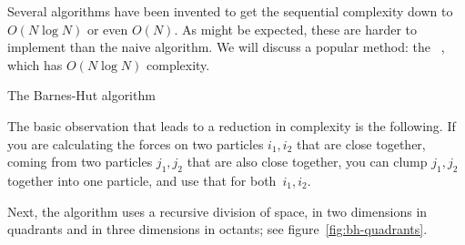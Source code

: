 Several algorithms have been invented to get the sequential complexity
down to $O(N\log N)$ or even $O(N)$. As might be expected, these are
harder to implement than the naive algorithm. We will discuss a
popular method: the ~\cite{BarnesHut},
which has $O(N\log N)$ complexity.

 {The Barnes-Hut algorithm}

The basic observation that leads to a reduction in complexity is the
following. If you are calculating the forces on two particles
$i_1,i_2$ that are close together, coming from two particles $j_1,j_2$
that are also close together, you can clump $j_1,j_2$ together into
one particle, and use that for both~$i_1,i_2$.

Next, the algorithm uses a recursive division of space, in two
dimensions in quadrants and in three dimensions in octants; see
figure~\ref{fig:bh-quadrants}.
